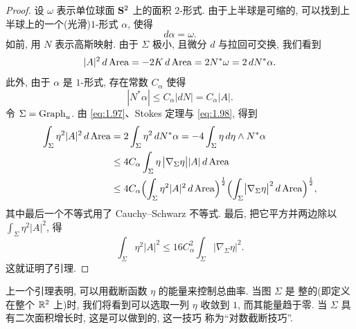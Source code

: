 \begin{proof}
设 $\omega$ 表示单位球面 $\mathbf{S}^2$ 上的面积 $2$-形式. 由于上半球是可缩的,
可以找到上半球上的一个(光滑)$1$-形式 $\alpha$, 使得
\begin{equation}
d\alpha=\omega.
\label{eq:1.96}
\end{equation}
如前, 用 $N$ 表示高斯映射. 由于 $\Sigma$ 极小, 且微分 $d$ 与拉回可交换,
我们看到
\begin{equation}
|A|^{2}\,d\operatorname{Area}=-2K\,d\operatorname{Area}=2N^{*}\omega=2\,dN^{*}\alpha.
\label{eq:1.97}
\end{equation}
此外, 由于 $\alpha$ 是 $1$-形式, 存在常数 $C_{\alpha}$ 使得
\begin{equation}
|N^{*}\alpha|\leq C_{\alpha}|dN|=C_{\alpha}|A|.
\label{eq:1.98}
\end{equation}
令 $\Sigma=\operatorname{Graph}_u$. 由 \eqref{eq:1.97}、Stokes 定理与 \eqref{eq:1.98}, 得到
\begin{equation}
\begin{aligned}
\int_{\Sigma}\eta^{2}|A|^{2}\,d\operatorname{Area}
&=2\int_{\Sigma}\eta^{2}\,dN^{*}\alpha
 =-4\int_{\Sigma}\eta\,d\eta\wedge N^{*}\alpha\\
&\leq4C_{\alpha}\int_{\Sigma}\eta\,\bigl|\nabla_{\Sigma}\eta\bigr|
 |A|\,d\operatorname{Area}\\
&\leq4C_{\alpha}
 \Bigl(\int_{\Sigma}\eta^{2}|A|^{2}\,d\operatorname{Area}\Bigr)^{\frac12}
 \Bigl(\int_{\Sigma}\bigl|\nabla_{\Sigma}\eta\bigr|^{2}\,d\operatorname{Area}\Bigr)^{\frac12},
\end{aligned}
\label{eq:1.99}
\end{equation}
其中最后一个不等式用了 Cauchy--Schwarz 不等式. 最后, 把它平方并两边除以
$\int_{\Sigma}\eta^{2}|A|^{2}$, 得
\begin{equation}
\int_{\Sigma}\eta^{2}|A|^{2}
 \leq16C_{\alpha}^{2}\int_{\Sigma}
 \bigl|\nabla_{\Sigma}\eta\bigr|^{2}.
\label{eq:1.100}
\end{equation}
这就证明了引理.
\end{proof}

上一个引理表明, 可以用截断函数 $\eta$ 的能量来控制总曲率. 当图 $\Sigma$ 是
整的(即定义在整个 $\mathbb{R}^2$ 上)时, 我们将看到可以选取一列 $\eta$ 收敛到 $1$,
而其能量趋于零. 当 $\Sigma$ 具有二次面积增长时, 这是可以做到的, 这一技巧
称为``对数截断技巧''.

